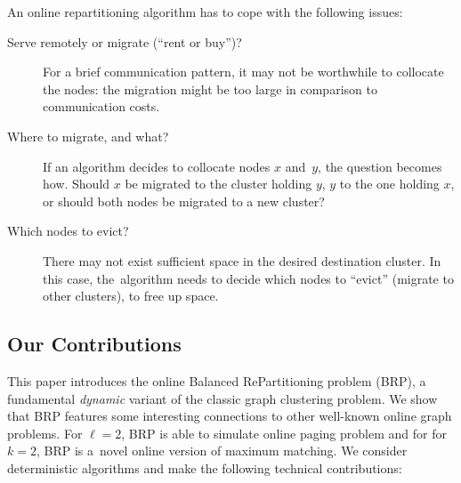\documentclass[11pt,a4paper]{scrartcl}
\begin{document}
An online repartitioning algorithm has to cope with the following issues:

\begin{description}

\item[Serve remotely or migrate (``rent or buy'')?] For a brief communication
pattern, it may not be worthwhile to collocate the nodes: the migration might
be too large in comparison to communication costs.

\item[Where to migrate, and what?]
If an algorithm decides to collocate nodes $x$ and~$y$, the question becomes
how. Should $x$ be migrated to the cluster holding $y$, $y$ to the one holding
$x$, or should both nodes be migrated to a new cluster?

\item[Which nodes to evict?]
There may not exist sufficient space in the desired destination cluster. In
this case, the~algorithm needs to decide which nodes to ``evict'' (migrate to
other clusters), to free up space.

\end{description}


\subsection{Our Contributions}

This paper introduces the online Balanced RePartitioning problem (BRP),
a fundamental \emph{dynamic} variant of the classic graph clustering problem. 
We show that BRP features some interesting connections to other well-known
online graph problems. For $\ell=2$, BRP is able to simulate online paging problem
and for for $k=2$, BRP is a~novel online version of maximum matching.
We consider deterministic algorithms and make the following technical
contributions:
\end{document}
